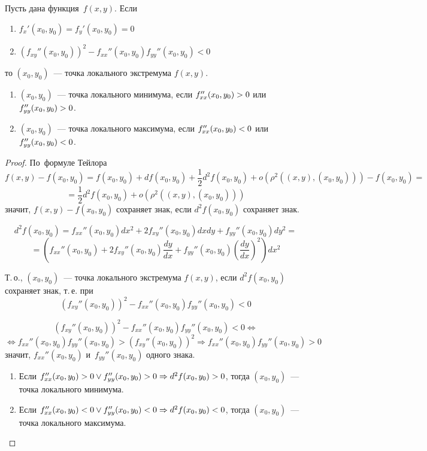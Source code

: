 \begin{theorem}
	Пусть дана функция~$f(x, y)$. Если
\begin{enumerate}
	\item $\displaystyle f_x'(x_0, y_0) = f_y'(x_0, y_0) = 0$
	\item $\displaystyle (f_{xy}''(x_0, y_0))^2 - f_{xx}''(x_0, y_0) f_{yy}''(x_0, y_0) < 0$
\end{enumerate}
	то $(x_0, y_0)$~--- точка локального экстремума $f(x, y)$.
	
\begin{enumerate}
	\item $(x_0, y_0)$~--- точка локального минимума,
	если $f_{xx}''(x_0, y_0) \opbr> 0$ или~$f_{yy}''(x_0, y_0) \opbr> 0$.
	\item $(x_0, y_0)$~--- точка локального максимума,
	если $f_{xx}''(x_0, y_0) \opbr< 0$ или~$f_{yy}''(x_0, y_0) \opbr< 0$.
\end{enumerate}
\end{theorem}
\begin{proof}
	По~формуле Тейлора
	\[ f(x, y) - f(x_0, y_0) = f(x_0, y_0) + df(x_0, y_0) + \frac12 d^2f(x_0, y_0) + o(\rho^2((x, y), (x_0, y_0))) - f(x_0, y_0) = \]
	\[ = \frac12 d^2f(x_0, y_0) + o(\rho^2((x, y), (x_0, y_0))) \]
	значит, $f(x, y) - f(x_0, y_0)$ сохраняет знак, если $d^2f(x_0, y_0)$ сохраняет знак.
	
	\[ d^2f(x_0, y_0) = f_{xx}''(x_0, y_0) dx^2 + 2f_{xy}''(x_0, y_0) dxdy + f_{yy}''(x_0, y_0) dy^2 = \]
	\[ = \left(f_{xx}''(x_0, y_0) + 2f_{xy}''(x_0, y_0) \frac{dy}{dx} + f_{yy}''(x_0, y_0) \left(\frac{dy}{dx}\right)^2\right) dx^2 \]
	
	Т.\,о., $(x_0, y_0)$~--- точка локального экстремума $f(x, y)$,
	если $d^2f(x_0, y_0)$ сохраняет знак, т.\,е. при
	\[ (f_{xy}''(x_0, y_0))^2 - f_{xx}''(x_0, y_0) f_{yy}''(x_0, y_0) < 0 \]
	
	\[ (f_{xy}''(x_0, y_0))^2 - f_{xx}''(x_0, y_0) f_{yy}''(x_0, y_0) < 0 \Leftrightarrow \]
	\[ \Leftrightarrow f_{xx}''(x_0, y_0) f_{yy}''(x_0, y_0) > (f_{xy}''(x_0, y_0))^2 \Rightarrow f_{xx}''(x_0, y_0) f_{yy}''(x_0, y_0) > 0 \]
	значит, $f_{xx}''(x_0, y_0)$ и~$f_{yy}''(x_0, y_0)$ одного знака.
	
\begin{enumerate}
	\item Если $f_{xx}''(x_0, y_0) > 0 \lor f_{yy}''(x_0, y_0) > 0 \opbr\Rightarrow d^2f(x_0, y_0) \opbr> 0$, тогда $(x_0, y_0)$~--- точка локального минимума.
	\item Если $f_{xx}''(x_0, y_0) < 0 \lor f_{yy}''(x_0, y_0) < 0 \opbr\Rightarrow d^2f(x_0, y_0) \opbr< 0$, тогда $(x_0, y_0)$~--- точка локального максимума.
\end{enumerate}
\end{proof}

